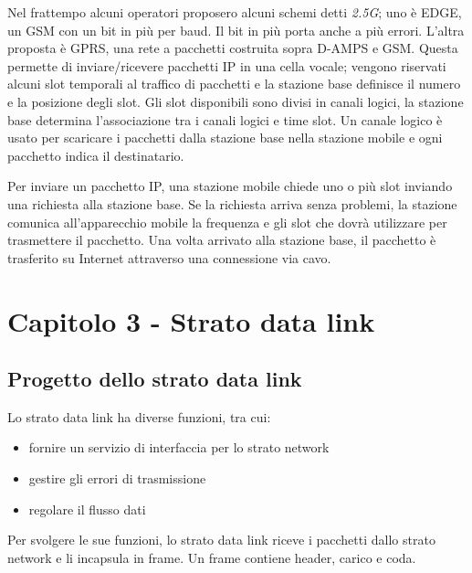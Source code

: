 Nel frattempo alcuni operatori proposero alcuni schemi detti \textit{2.5G}; 
uno è EDGE, un GSM con un bit in più per baud. Il bit in più porta anche a più errori.
L'altra proposta è GPRS, una rete a pacchetti costruita sopra D-AMPS e GSM.
Questa permette di inviare/ricevere pacchetti IP in una cella vocale;
vengono riservati alcuni slot temporali al traffico di pacchetti e la stazione base definisce il numero e la posizione degli slot.
Gli slot disponibili sono divisi in canali logici, la stazione base determina l’associazione tra i canali logici e time slot.
Un canale logico è usato per scaricare i pacchetti dalla stazione base nella stazione mobile e ogni pacchetto indica il destinatario.

Per inviare un pacchetto IP, una stazione mobile chiede uno o più slot inviando una richiesta alla stazione base.
Se la richiesta arriva senza problemi, la stazione comunica all’apparecchio mobile la frequenza e gli slot che dovrà utilizzare per trasmettere il pacchetto.
Una volta arrivato alla stazione base, il pacchetto è trasferito su Internet attraverso una connessione via cavo.

\newpage
\section{Capitolo 3 - Strato data link}

\subsection{Progetto dello strato data link} %
Lo strato data link ha diverse funzioni, tra cui:
\begin{itemize}
    \item fornire un servizio di interfaccia per lo strato network
    \item gestire gli errori di trasmissione
    \item regolare il flusso dati 
\end{itemize}
Per svolgere le sue funzioni, lo strato data link riceve i pacchetti dallo strato network e li incapsula in frame.
Un frame contiene header, carico e coda.

